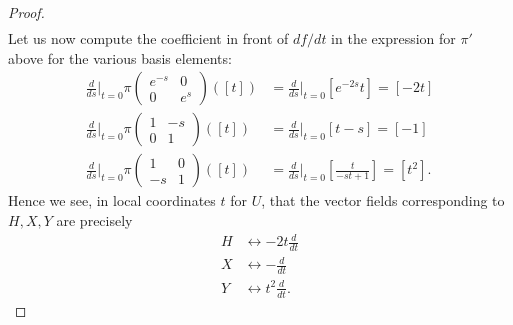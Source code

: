 \documentclass{../../mathnotes}
\begin{document}
\begin{proof}
\begin{align*}
    \end{align*}
    Let us now compute the coefficient in front of $df/dt$ in the expression for $\pi'$ above for the various basis elements:
    \begin{align*}
        \frac{d}{ds}\bigg|_{t=0}\pi\begin{pmatrix}e^{-s}&0\\0&e^{s}\end{pmatrix}([t])&=\frac{d}{ds}\bigg|_{t=0}\left[ e^{-2s}t \right]=[-2t]\\
        \frac{d}{ds}\bigg|_{t=0}\pi\begin{pmatrix}1&-s\\0&1\end{pmatrix}([t])&=\frac{d}{ds}\bigg|_{t=0}\left[ t-s \right]=[-1]\\
            \frac{d}{ds}\bigg|_{t=0}\pi\begin{pmatrix}1&0\\-s&1\end{pmatrix}([t])&=\frac{d}{ds}\bigg|_{t=0}\left[ \frac{t}{-st+1} \right]=[t^2].
    \end{align*}
    Hence we see, in local coordinates $t$ for $U$, that the vector fields corresponding to $H,X,Y$ are precisely
    \begin{align*}
        H&\longleftrightarrow -2t\frac{d}{d t}\\
        X&\longleftrightarrow -\frac{d}{d t}\\
        Y&\longleftrightarrow t^2\frac{d}{d t}.
    \end{align*}
\end{proof}
\end{document}
